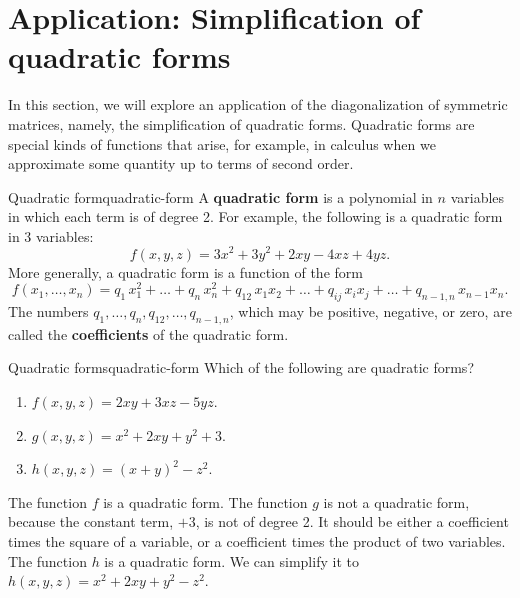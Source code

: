 \section{Application: Simplification of quadratic forms}

In this section, we will explore an application of the diagonalization
of symmetric matrices, namely, the simplification of quadratic forms.
Quadratic forms are special kinds of functions that arise, for
example, in calculus when we approximate some quantity up to terms of
second order.

\begin{definition}{Quadratic form}{quadratic-form}
  A \textbf{quadratic form}%
   is a polynomial in $n$ variables in which
  each term is of degree 2. For example, the following is a quadratic
  form in $3$ variables:
  \begin{equation*}
    f(x,y,z) = 3x^2 + 3y^2 + 2xy - 4xz + 4yz.
  \end{equation*}
  More generally, a quadratic form is a function of the form
  \begin{equation*}
    f(x_1,\ldots,x_n) = q_1\,x_1^2 + \ldots + q_n\,x_n^2 + q_{12}\,x_1x_2 +
    \ldots + q_{ij}\,x_ix_j + \ldots + q_{n-1,n}\,x_{n-1}x_n.
  \end{equation*}
  The numbers $q_1,\ldots,q_n,q_{12},\ldots,q_{n-1,n}$, which may be
  positive, negative, or zero, are called the \textbf{coefficients}%
   of the quadratic form.
\end{definition}

\begin{example}{Quadratic forms}{quadratic-form}
  Which of the following are quadratic forms?
  \begin{enumialphparenastyle}
    \begin{enumerate}
    \item $f(x,y,z) = 2xy + 3xz - 5yz$.
    \item $g(x,y,z) = x^2 + 2xy + y^2 + 3$.
    \item $h(x,y,z) = (x+y)^2 - z^2$.
    \end{enumerate}
  \end{enumialphparenastyle}
\end{example}

\begin{solution}
  The function $f$ is a quadratic form. The function $g$ is not a
  quadratic form, because the constant term, $+3$, is not of degree
  2. It should be either a coefficient times the square of a variable,
  or a coefficient times the product of two variables. The function
  $h$ is a quadratic form. We can simplify it to $h(x,y,z) = x^2 + 2xy
  + y^2 - z^2$.
\end{solution}

